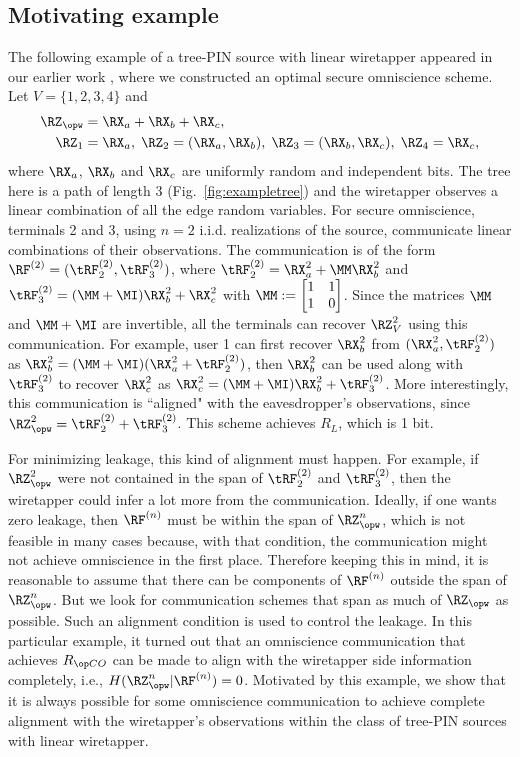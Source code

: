 \subsection{Motivating example} The following example of a tree-PIN source with linear wiretapper appeared in our earlier work \cite{chan20secure}, where we constructed an optimal secure omniscience scheme. Let $V=\{1,2,3,4\}$ and  
     \begin{align}
        \RZ_{\opw} &= \RX_a+\RX_b+\RX_c, \\
        \RZ_1 &= \RX_a, \; \RZ_2 = (\RX_a, \RX_b),\; \RZ_3 = (\RX_b, \RX_c),\; \RZ_4 =  \RX_c,
      \end{align}
  where $\RX_a$, $\RX_b$ and $\RX_c$ are uniformly random and independent bits. The tree here is a path of  length $3$ (Fig.~\ref{fig:exampletree}) and the wiretapper observes a linear combination of all the edge random variables. For secure omniscience, terminals 2 and 3, using $n=2$ i.i.d. realizations of the source, communicate linear combinations of their observations. The communication is of the form $\RF^{(2)} =(\tRF_2^{(2)},\tRF_3^{(2)})$, where  $\tRF_2^{(2)} =\RX^2_a+\MM \RX^2_b$ and $\tRF_3^{(2)}=(\MM + \MI) \RX_b^2 +\RX_c^2$ with $\MM:=\bM 1 & 1\\ 1 & 0\eM$.  Since the matrices $\MM$ and $\MM+\MI$ are invertible, all the terminals can recover $\RZ_V^2$ using this communication. For example, user 1 can first  recover $\RX_b^2$ from $(\RX_a^2, \tRF_2^{(2)})$ as $\RX_b^2 = (\MM+\MI)(\RX_a^2+ \tRF_2^{(2)})$, then $\RX_b^2$ can be used along with $\tRF_3^{(2)}$ to recover $\RX_c^2$ as $\RX_c^2 = (\MM+\MI)\RX_b^2+ \tRF_3^{(2)}$.  More interestingly, this communication is ``aligned" with the eavesdropper's observations, since $\RZ^2_{\opw} = \tRF_2^{(2)}+\tRF_3^{(2)}$. This scheme achieves $R_L$, which is 1 bit. 
  
  For minimizing leakage, this kind of alignment must happen. For example, if $\RZ^2_{\opw}$ were not contained in the span of $\tRF_2^{(2)}$ and $\tRF_3^{(2)}$, then the wiretapper could infer a lot more from the communication.  Ideally, if one wants zero leakage, then $\RF^{(n)}$ must be within the span of $\RZ^n_{\opw}$, which is not feasible in many cases because, with that condition, the communication might not achieve omniscience in the first place. Therefore keeping this in mind, it is reasonable to assume that there can be components of $\RF^{(n)}$ outside the span of $\RZ^n_{\opw}$. But we look for communication schemes that span as much of $\RZ_{\opw}$ as possible. Such an alignment condition is used to control the leakage. In this particular example, it turned out that an omniscience communication that achieves $\rco$ can be made to align with the wiretapper side information completely, i.e., $H(\RZ^n_{\opw}|\RF^{(n)})=0$.  Motivated by this example, we show that it is always possible for some omniscience communication to achieve complete alignment with the wiretapper's observations within the class of tree-PIN sources with linear wiretapper.
  
